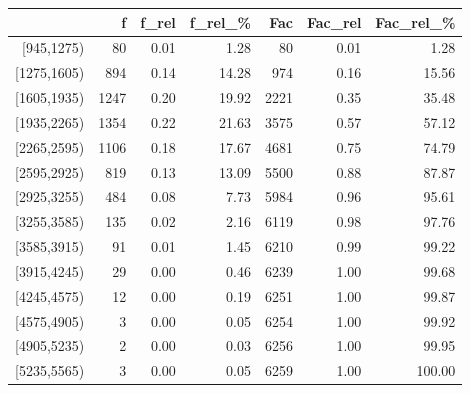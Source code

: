 \begin{table}[ht]
\centering
\begin{tabular}{rrrrrrr}
  \hline
 & f & f\_rel & f\_rel\_\% & Fac & Fac\_rel & Fac\_rel\_\% \\ 
  \hline
{[945,1275)} &  80 & 0.01 & 1.28 &  80 & 0.01 & 1.28 \\ 
  {[1275,1605)} & 894 & 0.14 & 14.28 & 974 & 0.16 & 15.56 \\ 
  {[1605,1935)} & 1247 & 0.20 & 19.92 & 2221 & 0.35 & 35.48 \\ 
  {[1935,2265)} & 1354 & 0.22 & 21.63 & 3575 & 0.57 & 57.12 \\ 
  {[2265,2595)} & 1106 & 0.18 & 17.67 & 4681 & 0.75 & 74.79 \\ 
  {[2595,2925)} & 819 & 0.13 & 13.09 & 5500 & 0.88 & 87.87 \\ 
  {[2925,3255)} & 484 & 0.08 & 7.73 & 5984 & 0.96 & 95.61 \\ 
  {[3255,3585)} & 135 & 0.02 & 2.16 & 6119 & 0.98 & 97.76 \\ 
  {[3585,3915)} &  91 & 0.01 & 1.45 & 6210 & 0.99 & 99.22 \\ 
  {[3915,4245)} &  29 & 0.00 & 0.46 & 6239 & 1.00 & 99.68 \\ 
  {[4245,4575)} &  12 & 0.00 & 0.19 & 6251 & 1.00 & 99.87 \\ 
  {[4575,4905)} &   3 & 0.00 & 0.05 & 6254 & 1.00 & 99.92 \\ 
  {[4905,5235)} &   2 & 0.00 & 0.03 & 6256 & 1.00 & 99.95 \\ 
  {[5235,5565)} &   3 & 0.00 & 0.05 & 6259 & 1.00 & 100.00 \\ 
   \hline
\end{tabular}
\end{table}
